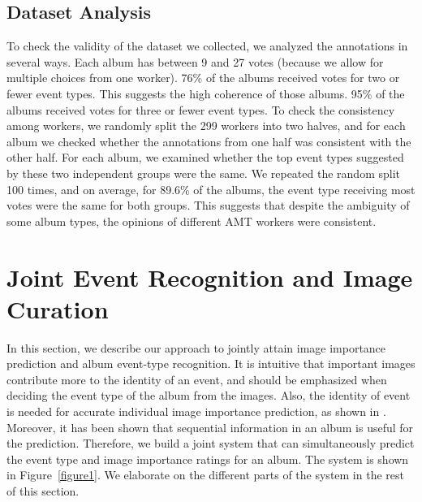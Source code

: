 \documentclass[runningheads]{llncs}
\begin{document}
\subsection{Dataset Analysis}
To check the validity of the dataset we collected, we analyzed the annotations in several ways. Each album has between 9 and 27 votes (because we allow for multiple choices from one worker). 76\% of the albums received votes for two or fewer event types. This suggests the high coherence of those albums. 95\% of the albums received votes for three or fewer event types.  To check the consistency among workers, we randomly split the 299 workers into two halves, and for each album we checked whether the annotations from one half was consistent with the other half. For each album, we examined whether the top event types suggested by these two independent groups were the same.
%
%
%
We repeated the random split 100 times, and on average, for 89.6\% of the albums, the event type receiving most votes were the same for both groups. This suggests that despite the ambiguity of some album types, the opinions of different AMT workers were consistent.

\section{Joint Event Recognition and Image Curation}
\label{approach}
In this section, we describe our approach to jointly attain image importance prediction and album event-type recognition. It is intuitive that important images contribute  more to the identity of an event, and should be emphasized when deciding the event type of the album from the images. Also, the identity of event is needed for accurate individual image importance prediction, as shown in \cite{CVPR}. Moreover, it has been shown that sequential information in an album is useful for the prediction. Therefore, we build a joint system that can simultaneously predict the event type and image importance ratings for an album. The system is shown in Figure~\ref{figure1}. We  elaborate on the different parts of the system in the rest of this section.
%
%
%
\end{document}
